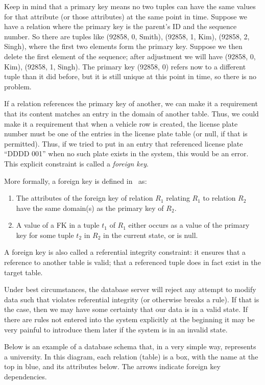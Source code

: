 Keep in mind that a primary key means no two tuples can have the same values for that attribute (or those attributes) at the same point in time. Suppose we have a relation where the primary key is the parent's ID and the sequence number. So there are tuples like (92858, 0, Smith), (92858, 1, Kim), (92858, 2, Singh), where the first two elements form the primary key. Suppose we then delete the first element of the sequence; after adjustment we will have (92858, 0, Kim), (92858, 1, Singh). The primary key (92858, 0) refers now to a different tuple than it did before, but it is still unique at this point in time, so there is no problem.

If a relation references the primary key of another, we can make it a requirement that its content matches an entry in the domain of another table. Thus, we could make it a requirement that when a vehicle row is created, the license plate number must be one of the entries in the license plate table (or null, if that is permitted). Thus, if we tried to put in an entry that referenced license plate ``DDDD 001'' when no such plate exists in the system, this would be an error. This explicit constraint is called a \textit{foreign key}. 

More formally, a foreign key is defined in~\cite{fds} as:
\begin{enumerate}
\item The attributes of the foreign key of relation $R_{1}$ relating $R_{1}$ to relation $R_{2}$ have the same domain(s) as the primary key of $R_{2}$.
\item A value of a FK in a tuple $t_{1}$ of $R_{1}$ either occurs as a value of the primary key for some tuple $t_{2}$ in $R_{2}$ in the current state, or is null. 
\end{enumerate}


A foreign key is also called a referential integrity constraint: it ensures that a reference to another table is valid; that a referenced tuple does in fact exist in the target table.

Under best circumstances, the database server will reject any attempt to modify data such that violates referential integrity (or otherwise breaks a rule). If that is the case, then we may have some certainty that our data is in a valid state. If there are rules not entered into the system explicitly at the beginning it may be very painful to introduce them later if the system is in an invalid state. 

Below is an example of a database schema that, in a very simple way, represents a university. In this diagram, each relation (table) is a box, with the name at the top in blue, and its attributes below. The arrows indicate foreign key dependencies. 

